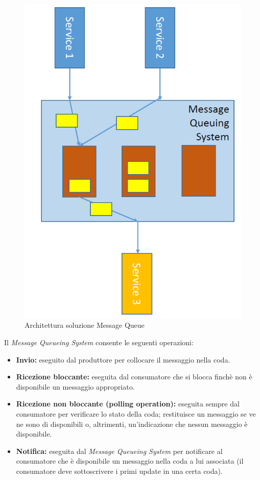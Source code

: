 \documentclass{article}
\begin{document}
\begin{figure}[H]
\centering
\includegraphics[scale=0.5]{img/MQS.PNG}
\caption{Architettura soluzione Message Queue}
\end{figure}

Il \textit{Message Queueing System} consente le seguenti operazioni:
\begin{itemize}
    \item \textbf{Invio:} eseguito dal produttore per collocare il messaggio nella coda.
    \item \textbf{Ricezione bloccante:} eseguita dal consumatore che si blocca finchè non è disponibile un messaggio appropriato.
    \item \textbf{Ricezione non bloccante (polling operation):} eseguita sempre dal consumatore per verificare lo stato della coda; restituisce un messaggio se ve ne sono di disponibili o, altrimenti, un'indicazione che nessun messaggio è disponibile.
    \item \textbf{Notifica:} eseguita dal \textit{Message Queueing System} per notificare al consumatore che è disponibile un messaggio nella coda a lui associata (il consumatore deve sottoscrivere i primi update in una certa coda).
\end{itemize}
\end{document}
